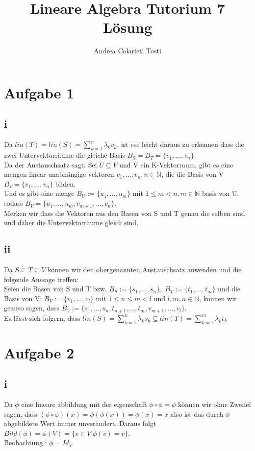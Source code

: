 \documentclass[10pt,a4paper]{article}
\author{Andrea Colarieti Tosti}
\title{Lineare Algebra Tutorium 7 Lösung}
\begin{document}
\maketitle \newpage

\section{Aufgabe 1}
\subsection{i}
Da $lin(T) = lin(S) = \sum_{k = 1}^{n} \lambda_k v_k$, ist ese leicht daraus zu erkennen dass die zwei Untervektorräume die gleiche Basis $ B_S = B_T = \{v_1,...,v_n\}$.\\
Da der Austauschsatz sagt: Sei $U\subseteq V$ und V ein K-Vektorraum, gibt es eine mengen linear unabhängige vektoren $v_1,...,v_n, n \in \mathbb{N}$, die die Basis von V $B_V = \{v_1,...,v_n\}$ bilden.\\
Und es gibt eine menge $B_U:=\{u_1,...,u_m\}$ mit $1\leqslant m < n, m \in \mathbb{N}$ basis von U, sodass $ B_V = \{u_1,...,u_m,v_{m+1},...,v_n \} $.\\
Merken wir dass die Vektoren aus den Basen von S und T genau die selben sind und daher die Untervektorräume gleich sind.
\subsection{ii}
Da $ S \subseteq T \subseteq V $ können wir den obergenannten Austauschsatz anwenden und die folgende Aussage treffen:\\
Seien die Basen von S und T bzw. $ B_S := \{s_1,...,s_n\},\; B_T := \{t_1,...,t_m\}$ und die Basis von V: $B_V:=\{v_1,...,v_l \}$ mit $ 1\leq n \leq m < l $ und $ l,m,n \in \mathbb{N}$, können wir geauso sagen, dass $ B_V:=\{s_1,...,s_n,t_{n+1},...,t_m,v_{m+1},...,v_l \}$.\\
Es lässt sich folgern, dass $lin(S)= \sum_{k = 1}^{n} \lambda_k s_k \subseteq lin(T) =  \sum_{k = 1}^{m} \lambda_k t_k $
\section{Aufgabe 2}
\subsection{i}
Da $\phi$ eine lineare abbildung mit der eigenschaft $\phi \circ \phi = \phi$ können wir ohne Zweifel sagen, dass $(\phi \circ \phi) (x) = \phi( \phi (x) ) = \phi (x) = x $ also ist das durch $\phi$ abgebildete Wert immer unverändert. Daraus folgt $ Bild(\phi ) = \phi(V) = \{ v \in V | \phi(v) = v \}$.\\
Beobachtung : $\phi = Id_V$
\end{document}
